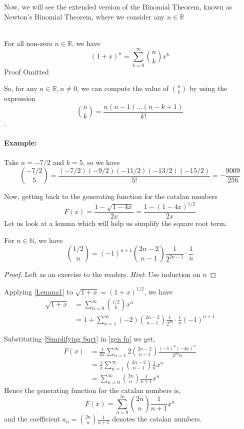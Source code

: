 Now, we will see the extended version of the Binomial Theorem, known as Newton's Binomial Theorem, where we consider any $n \in \mathbb{R}$
\begin{theorem} \\ For all non-zero $n \in \mathbb{R}$, we have $$(1+x)^n= \sum_{k=0}^\infty {n \choose k}x^k$$
Proof Omitted
\end{theorem}

\noindent So, for any $n \in \mathbb{R}, n \ne 0$, we can compute the value of ${n \choose k}$ by using the expression $${n \choose k}=\frac{n(n-1)\dots (n-k+1)}{k!}$$.

\paragraph{Example:} Take $n=-7/2$ and $k=5$, so we have
$${-7/2 \choose 5}=\frac{(-7/2)(-9/2)(-11/2)(-13/2)(-15/2)}{5!}=-\frac{9009}{256}$$

\noindent Now, getting back to the generating function for the catalan numbers
\begin{equation} \label{gen fn}
    F(x)=\frac{1-\sqrt{1-4x}}{2x}=\frac{1-(1-4x)^{1/2}}{2x}
\end{equation}
Let us look at a lemma which will help us simplify the square root term.
\begin{lemma} \label{Lemma1}
For $ n \in \mathbb{N}$, we have $${1/2 \choose n}=(-1)^{n+1}{2n-2 \choose n-1}\frac{1}{2^{2n-1}}\cdot \frac{1}{n}$$
\end{lemma}
\begin{proof}
Left as an exercise to the readers. \textit{Hint}: Use induction on $n$

\end{proof}
\noindent Applying \ref{Lemma1} to $\sqrt{1+x}=(1+x)^{1/2}$, we have
\begin{align} \label{Simplifying Sqrt}
    \sqrt{1+x} &=\sum_{n=0}^\infty {1/2 \choose k}x^n \nonumber \\
    &= 1+ \sum_{n=1}^\infty (-2){2n-2 \choose n-1}\frac{1}{2^{2n}}\cdot \frac{1}{n}(-1)^{n+1}
\end{align}

Substituting \ref{Simplifying Sqrt} in \ref{gen fn} we get,
\begin{align*}
    F(x) &= \frac{1}{2x}\sum_{n=1}^\infty 2{2n-2 \choose n-1}\frac{(-1)^n(-4x)^n}{2^{2n}n} \\
    & = \frac{1}{x}\sum_{n=1}^\infty {2n-2 \choose n-1}\frac{1}{n}x^n\\
    & = \sum_{n=0}^\infty {2n \choose n}\frac{1}{n+1}x^n
\end{align*}
Hence the generating function for the catalan numbers is,
$$F(x)=\sum_{n=0}^\infty {2n \choose n}\frac{1}{n+1}x^n$$
and the coefficient $a_n={2n \choose n}\frac{1}{n+1}$ denotes the catalan numbers.

